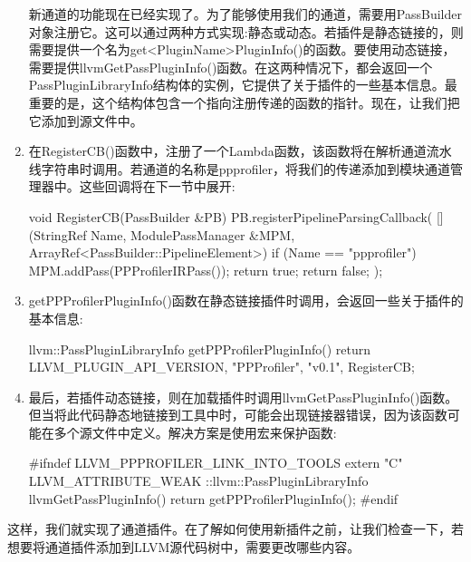 \begin{enumerate}
新通道的功能现在已经实现了。为了能够使用我们的通道，需要用PassBuilder对象注册它。这可以通过两种方式实现:静态或动态。若插件是静态链接的，则需要提供一个名为get<PluginName>PluginInfo()的函数。要使用动态链接，需要提供llvmGetPassPluginInfo()函数。在这两种情况下，都会返回一个PassPluginLibraryInfo结构体的实例，它提供了关于插件的一些基本信息。最重要的是，这个结构体包含一个指向注册传递的函数的指针。现在，让我们把它添加到源文件中。

\item
在RegisterCB()函数中，注册了一个Lambda函数，该函数将在解析通道流水线字符串时调用。若通道的名称是ppprofiler，将我们的传递添加到模块通道管理器中。这些回调将在下一节中展开:

\begin{cpp}
void RegisterCB(PassBuilder &PB) {
    PB.registerPipelineParsingCallback(
        [](StringRef Name, ModulePassManager &MPM,
           ArrayRef<PassBuilder::PipelineElement>) {
            if (Name == "ppprofiler") {
                MPM.addPass(PPProfilerIRPass());
                return true;
            }
            return false;
        });
}
\end{cpp}

\item
getPPProfilerPluginInfo()函数在静态链接插件时调用，会返回一些关于插件的基本信息:

\begin{cpp}
llvm::PassPluginLibraryInfo getPPProfilerPluginInfo() {
    return {LLVM_PLUGIN_API_VERSION, "PPProfiler", "v0.1",
        RegisterCB};
}
\end{cpp}

\item
最后，若插件动态链接，则在加载插件时调用llvmGetPassPluginInfo()函数。但当将此代码静态地链接到工具中时，可能会出现链接器错误，因为该函数可能在多个源文件中定义。解决方案是使用宏来保护函数:

\begin{cpp}
#ifndef LLVM_PPPROFILER_LINK_INTO_TOOLS
extern "C" LLVM_ATTRIBUTE_WEAK ::llvm::PassPluginLibraryInfo
llvmGetPassPluginInfo() {
    return getPPProfilerPluginInfo();
}
#endif
\end{cpp}

\end{enumerate}

这样，我们就实现了通道插件。在了解如何使用新插件之前，让我们检查一下，若想要将通道插件添加到LLVM源代码树中，需要更改哪些内容。


